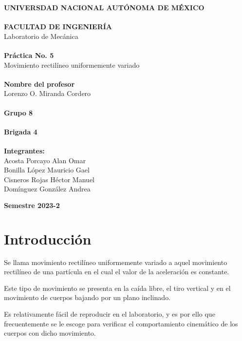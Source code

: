 \documentclass[12pt, titlepage]{report}
\begin{document}
\begin{titlepage}
\begin{center}
            \large \textbf{UNIVERSDAD NACIONAL AUTÓNOMA DE MÉXICO\\}
            \textbf{\\FACULTAD DE INGENIERÍA\\} 
            \hfill \break
            Laboratorio de Mecánica\\
            \Large \textbf{\\Práctica No. 5\\}
            \large Movimiento rectilíneo uniformemente variado\\
            \Large \textbf{\\Nombre del profesor\\}
            \large Lorenzo O. Miranda Cordero\\
            \Large \textbf{\\Grupo 8\\}
            \textbf{\\Brigada 4\\}
            \textbf{\\Integrantes:\\}
            Acosta Porcayo Alan Omar\\
            Bonilla López Mauricio Gael\\
            Cisneros Rojas Héctor Manuel\\
            Domínguez González Andrea\\
        \end{center}
        \begin{flushright}
            \Large \textbf{Semestre 2023-2}
        \end{flushright}
    \end{titlepage}

    \section*{Introducción}
    Se llama movimiento rectilíneo uniformemente variado a aquel movimiento rectilíneo de una partícula en el cual el valor de la aceleración es constante.

    Este tipo de movimiento se presenta en la caída libre, el tiro vertical y en el movimiento de cuerpos bajando por un plano inclinado.

    Es relativamente fácil de reproducir en el laboratorio, y es por ello que frecuentemente se le escoge para verificar el comportamiento cinemático de los cuerpos con dicho movimiento.
\end{document}
